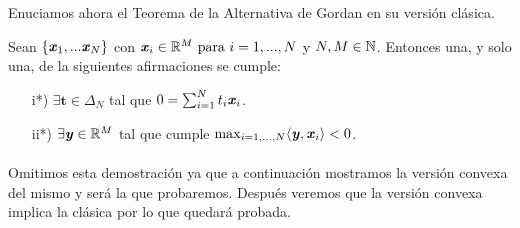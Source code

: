 	Enuciamos ahora el Teorema de la Alternativa de Gordan en su versión clásica.
	\begin{teoremaBox}\label{GordanClasic}
		Sean $ \{\textbf{\emph{x}}_1,...\textbf{\emph{x}}_N\}$ con $ \textbf{\emph{x}}_i \in \mathbb{R}^M \text{ para } i=1,...,N$ y $ N, M \in \mathbb{N} $. Entonces una, y solo una, de la siguientes afirmaciones se cumple:
		
		\begin{itemize}
			\item[i*)] $ \exists \mathbf{t} \in \Delta_N $ tal que $ 0 = \sum_{i=1}^{N}{t_i \textbf{\emph{x}}_i}$.
			\item[ii*)] $ \exists \textbf{\emph{y}} \in \mathbb{R}^M $ tal que cumple $ \max_{i=1,...,N} \langle \textbf{\emph{y}}, \textbf{\emph{x}}_i \rangle < 0 $.
		\end{itemize}
	\end{teoremaBox}

	\paragraph{} Omitimos esta demostración ya que a continuación mostramos la versión convexa del mismo y será la que probaremos. Después veremos que la versión convexa  implica la clásica por lo que quedará probada.
	
